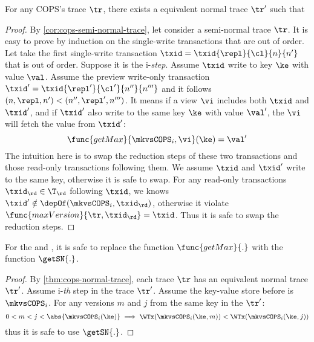 \begin{theorem}
    \label{thm:cops-normal-trace}
    \label{lem:cops-normal-trace}
    \label{cor:cops-normal-trace}
    For any COPS's trace \( \tr \), there exists a equivalent normal trace \( \tr' \) such that
\end{theorem}
\begin{proof}
    By \cref{cor:cops-semi-normal-trace}, let consider a semi-normal trace \( \tr \).
    It is easy to prove by induction on the single-write transactions that are out of order.
    Let take the first single-write transaction \( \txid = \txid{\repl}{\cl}{n}{n'} \) that is out of order.
    Suppose it is the i-\emph{step}.
    Assume \( \txid \) write to key \( \ke \) with value \( \val \).
    Assume the preview write-only transaction \( \txid'  = \txid{\repl'}{\cl'}{n''}{n'''} \) and it follows \( (n,\repl,n') < (n'', \repl', n''') \).
    It means if a view \( \vi \) includes both \( \txid \)  and \( \txid' \), and if \( \txid' \) also write to the same key \( \ke \) with value \( \val' \), the \( \vi \) will fetch the value from \( \txid' \):
    \begin{equation}
        \label{equ:out-order-wrte-older-value}
        \func{getMax}{\mkvsCOPS_i,\vi}(\ke) = \val'
    \end{equation}
    The intuition here is to swap the reduction steps of these two transactions and those read-only transactions following them.
    We assume \( \txid \)  and \( \txid' \) write to the same key, otherwise it is safe to swap.
    For any read-only transactions \( \txid_{\rd} \in \T_{\rd} \) following \( \txid \), we knows \( \txid' \notin \depOf(\mkvsCOPS_i, \txid_{\rd}) \), otherwise it violate \( \func{maxVersion}{\tr, \txid_\rd} = \txid \).
    Thus it is safe to swap the reduction steps.
\end{proof}


\begin{corollary}
    \label{cor:get-max-to-get-snap}
    For the  and , it is safe to replace the function \( \func{getMax}{.} \) with the function \( \getSN{.} \).
\end{corollary}
\begin{proof}
    By \cref{thm:cops-normal-trace}, each trace \( \tr \) has an equivalent normal trace \( \tr' \).
    Assume i-\emph{th} step in the trace \( \tr' \).
    Assume the key-value store before is \( \mkvsCOPS_i \).
    For any versions \( m \) and \( j \) from the same key in the \( \tr' \):
    \[
        0 < m < j < \abs{\mkvsCOPS_i(\ke)} \implies \WTx(\mkvsCOPS_i(\ke,m)) <  \WTx(\mkvsCOPS_i(\ke,j))
    \]
    thus it is safe to use \( \getSN{.} \).
\end{proof}

